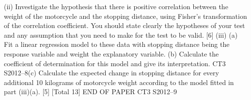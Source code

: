 \documentclass[a4paper,12pt]{article}
\begin{document}
\begin{enumerate}
(ii) Investigate the hypothesis that there is positive correlation between the weight
of the motorcycle and the stopping distance, using Fisher’s transformation of
the correlation coefficient. You should state clearly the hypotheses of your
test and any assumption that you need to make for the test to be valid.
[6]
(iii) (a)
Fit a linear regression model to these data with stopping distance being
the response variable and weight the explanatory variable.
(b)
Calculate the coefficient of determination for this model and give its
interpretation.
CT3 S2012–8(c)
Calculate the expected change in stopping distance for every additional
10 kilograms of motorcycle weight according to the model fitted in
part (iii)(a).
[5]
[Total 13]
END OF PAPER
CT3 S2012–9














\end{enumerate}
\end{document}

